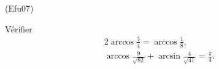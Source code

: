 \begin{tiny}(Efu07)\end{tiny} V{\'e}rifier
\begin{eqnarray*}
2\arccos \frac{3}{4}=\arccos \frac{1}{8}, \\
\arccos \frac{9}{\sqrt{82}}+\arcsin \frac{4}{\sqrt{41}}=\frac{\pi
}{4}.
\end{eqnarray*}
